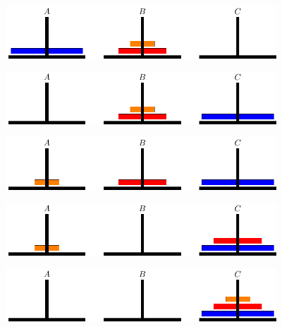 \begin{frame}
  \begin{figure}[htbp]
    \centering
    \includegraphics[width=4in]{ch09/images/ht3.pdf}
  \end{figure}
\end{frame}

\begin{frame}
  \begin{figure}[htbp]
    \centering
    \includegraphics[width=4in]{ch09/images/ht4.pdf}
  \end{figure}
\end{frame}

\begin{frame}
  \begin{figure}[htbp]
    \centering
    \includegraphics[width=4in]{ch09/images/ht5.pdf}
  \end{figure}
\end{frame}

\begin{frame}
  \begin{figure}[htbp]
    \centering
    \includegraphics[width=4in]{ch09/images/ht6.pdf}
  \end{figure}
\end{frame}

\begin{frame}
  \begin{figure}[htbp]
    \centering
    \includegraphics[width=4in]{ch09/images/ht7.pdf}
  \end{figure}
\end{frame}


\begin{frame}
  
\end{frame}
